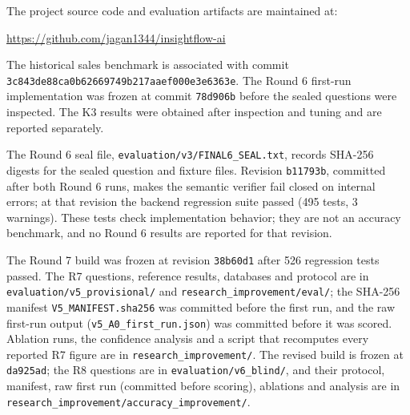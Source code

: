 \documentclass[conference]{IEEEtran}
\begin{document}
The project source code and evaluation artifacts are maintained at:

\url{https://github.com/jagan1344/insightflow-ai}

The historical sales benchmark is associated with commit \texttt{3c843de88c\allowbreak{}a0b6266974\allowbreak{}9b217aaef0\allowbreak{}00e3e6363e}. The Round 6 first-run implementation was frozen at commit \texttt{78d906b} before the sealed questions were inspected. The K3 results were obtained after inspection and tuning and are reported separately.

The Round 6 seal file, \texttt{evaluation/\allowbreak{}v3/\allowbreak{}FINAL6\_SEAL.txt}, records SHA-256 digests for the sealed question and fixture files. Revision \texttt{b11793b}, committed after both Round 6 runs, makes the semantic verifier fail closed on internal errors; at that revision the backend regression suite passed (495 tests, 3 warnings). These tests check implementation behavior; they are not an accuracy benchmark, and no Round 6 results are reported for that revision.

The Round 7 build was frozen at revision \texttt{38b60d1} after 526 regression tests passed. The R7 questions, reference results, databases and protocol are in \texttt{evaluation/\allowbreak{}v5\_provisional/} and \texttt{research\_\allowbreak{}improvement/\allowbreak{}eval/}; the SHA-256 manifest \texttt{V5\_MANIFEST.sha256} was committed before the first run, and the raw first-run output (\texttt{v5\_A0\_first\_run.json}) was committed before it was scored. Ablation runs, the confidence analysis and a script that recomputes every reported R7 figure are in \texttt{research\_\allowbreak{}improvement/}. The revised build is frozen at \texttt{da925ad}; the R8 questions are in \texttt{evaluation/\allowbreak{}v6\_blind/}, and their protocol, manifest, raw first run (committed before scoring), ablations and analysis are in \texttt{research\_\allowbreak{}improvement/\allowbreak{}accuracy\_\allowbreak{}improvement/}.
\end{document}
